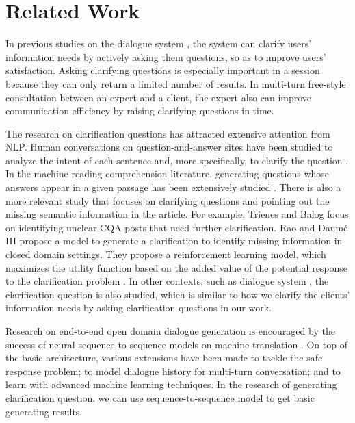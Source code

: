 \section{Related Work}
\label{related}

In previous studies on the dialogue system \citep{DBLP:conf/sigir/AliannejadiZCC19}, the system can clarify users' information needs by actively asking them questions, so as to improve users' satisfaction. Asking clarifying questions is especially important in a session because they can only return a limited number of results. In multi-turn free-style consultation between an expert and a client, the expert also can improve communication efficiency by raising clarifying questions in time.

The research on clarification questions has attracted extensive attention 
from NLP\citep{DBLP:conf/acl/DaumeR18}. Human conversations on question-and-answer 
sites have been studied to analyze the intent of each sentence \citep{DBLP:journals/corr/abs-1804-08759} and, more specifically, to clarify the question \citep{DBLP:conf/chiir/BraslavskiSAD17}. In the machine reading comprehension literature, generating questions whose answers appear in a given passage has been extensively studied \citep{DBLP:conf/emnlp/DuanTCZ17,DBLP:conf/naacl/HeilmanS10,DBLP:conf/nlpcc/ZhouYWTBZ17}. There is also a more relevant study that focuses on clarifying questions and pointing out the missing semantic information in the article. For example, Trienes and Balog \citep{DBLP:conf/ecir/TrienesB19} focus on identifying unclear CQA posts that need further clarification. Rao and Daum{\'{e}} III \citep{DBLP:conf/naacl/RaoD19} propose a model to generate a clarification to identify missing information in closed domain settings. They propose a reinforcement learning model, which maximizes the utility function based on the added value of the potential response to the clarification problem \citep{DBLP:conf/acl/DaumeR18}. In other contexts, such as dialogue system \citep{DBLP:conf/naacl/BoniM03,DBLP:journals/nle/BoniM05}, the clarification question is also studied, which is similar to how we clarify the clients' information needs by asking clarification questions in our work.

Research on end-to-end open domain dialogue generation is encouraged by the success of neural sequence-to-sequence models on machine translation \citep{DBLP:conf/nips/SutskeverVL14}. On top of the basic architecture\citep{DBLP:conf/acl/ShangLL15}, various extensions have been made to tackle the safe response problem\citep{DBLP:conf/acl/QiuLBZY19}; to model dialogue history for multi-turn conversation\citep{DBLP:conf/aaai/SerbanSLCPCB17}; and to learn with advanced machine learning techniques\citep{li-etal-2017-adversarial}. In the research of generating clarification question, we can use sequence-to-sequence model to get basic generating results.

